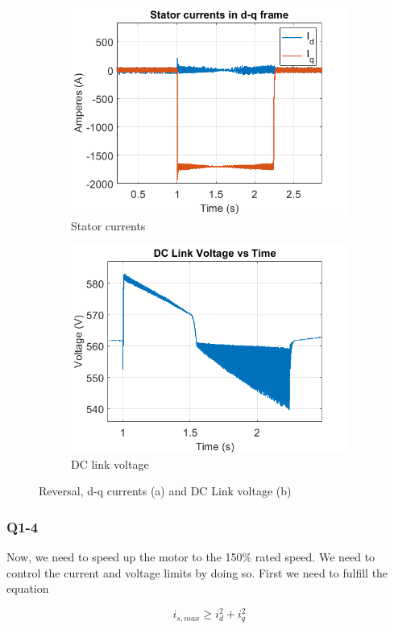 \begin{figure}[H]
        \centering
        \begin{subfigure}[b]{0.475\textwidth}
            \centering
            \includegraphics[width = 8 cm]{figs/reverse_sv_dq.png}
            \caption{Stator currents}
            \label{fig:sc2}
        \end{subfigure}
        \hfill
        \begin{subfigure}[b]{0.475\textwidth}  
            \centering 
            \includegraphics[width = 8 cm]{figs/reverse_sv_dc.png}
            \caption{DC link voltage}
            \label{fig:dc2}
        \end{subfigure}
        \caption{Reversal, d-q currents (a) and DC Link voltage (b)}
        \label{fig:dcc}
        \end{figure}        

\subsubsection{Q1-4}

Now, we need to speed up the motor to the 150\% rated speed. We need to control the current and voltage limits by doing so. First we need to fulfill the equation

\begin{equation}
    i_{s,max} \geq i_d^2 + i_q^2 
\end{equation}

